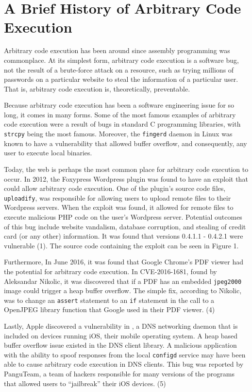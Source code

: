 \section{A Brief History of Arbitrary Code Execution}

Arbitrary code execution has been around since assembly programming was commonplace. At its simplest form, arbitrary code execution is a software bug, not the result of a brute-force attack on a resource, such as trying millions of passwords on a particular website to steal the information of a particular user. That is, arbitrary code execution is, theoretically, preventable.

Because arbitrary code execution has been a software engineering issue for so long, it comes in many forms. Some of the most famous examples of arbitrary code execution were a result of bugs in standard C programming libraries, with \texttt{strcpy} being the most famous. Moreover, the \texttt{fingerd} daemon in Linux was known to have a vulnerability that allowed buffer overflow, and consequently, any user to execute local binaries.

Today, the web is perhaps the most common place for arbitrary code execution to occur. In 2012, the Foxypress Wordpress plugin was found to have an exploit that could allow arbitrary code execution. One of the plugin’s source code files, \texttt{uploadify}, was responsible for allowing users to upload remote files to their Wordpress servers. When the exploit was found, it allowed for remote files to execute malicious PHP code on the user’s Wordpress server. Potential outcomes of this bug include website vandalism, database corruption, and stealing of credit card (or any other) information. It was found that versions 0.4.1.1 - 0.4.2.1 were vulnerable (1). The source code containing the exploit can be seen in Figure 1.

Furthermore, In June 2016, it was found that Google Chrome’s PDF viewer had the potential for arbitrary code execution. In CVE-2016-1681, found by Aleksandar Nikolic, it was discovered that if a PDF has an embedded \texttt{jpeg2000} image could trigger a heap buffer overflow. The simple fix, according to Nikolic, was to change an \texttt{assert} statement to an \texttt{if} statement in the call to a  OpenJPEG library function that Google used in their PDF viewer. (4)

Lastly, Apple discovered a vulnerability in , a DNS networking daemon that is included on devices running iOS, their mobile operating system. A heap based buffer overflow issue existed in the DNS client library. A malicious application with the ability to spoof responses from the local \texttt{configd} service may have been able to cause arbitrary code execution in DNS clients. This bug was reported by PanguTeam, a team of hackers responsible for many versions of the programs that allowed users to “jailbreak” their iOS devices. (5)